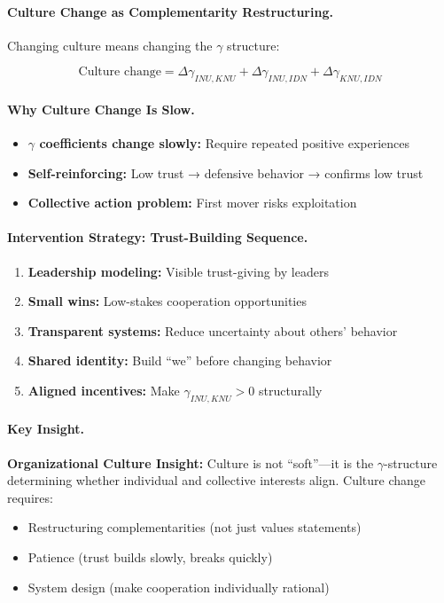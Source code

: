 \paragraph{Culture Change as Complementarity Restructuring.}
Changing culture means changing the $\gamma$ structure:

\begin{equation}
\text{Culture change} = \Delta \gamma_{INU,KNU} + \Delta \gamma_{INU,IDN} + \Delta \gamma_{KNU,IDN}
\end{equation}

\paragraph{Why Culture Change Is Slow.}
\begin{itemize}
\item \textbf{$\gamma$ coefficients change slowly:} Require repeated positive experiences
\item \textbf{Self-reinforcing:} Low trust → defensive behavior → confirms low trust
\item \textbf{Collective action problem:} First mover risks exploitation
\end{itemize}

\paragraph{Intervention Strategy: Trust-Building Sequence.}
\begin{enumerate}
\item \textbf{Leadership modeling:} Visible trust-giving by leaders
\item \textbf{Small wins:} Low-stakes cooperation opportunities
\item \textbf{Transparent systems:} Reduce uncertainty about others' behavior
\item \textbf{Shared identity:} Build ``we'' before changing behavior
\item \textbf{Aligned incentives:} Make $\gamma_{INU,KNU} > 0$ structurally
\end{enumerate}

\paragraph{Key Insight.}
\begin{tcolorbox}[colback=yellow!10!white, colframe=yellow!50!black]
\textbf{Organizational Culture Insight:}
Culture is not ``soft''---it is the $\gamma$-structure determining whether
individual and collective interests align. Culture change requires:
\begin{itemize}
\item Restructuring complementarities (not just values statements)
\item Patience (trust builds slowly, breaks quickly)
\item System design (make cooperation individually rational)
\end{itemize}
\end{tcolorbox}


